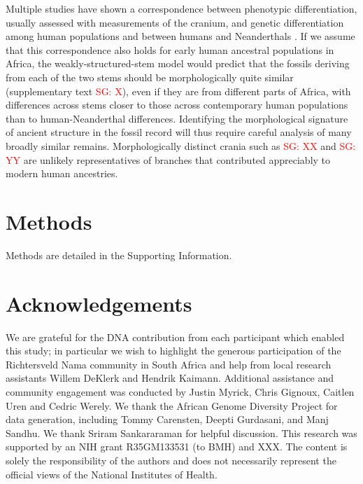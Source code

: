 \documentclass[]{article}
\newcommand{\sgcomment}[1]{{\textcolor{red}{SG: #1}}}
\begin{document}
Multiple studies have shown a correspondence between phenotypic
differentiation, usually assessed with measurements of the cranium, and genetic
differentiation among human populations and between humans and Neanderthals
\citep{Relethford1994-mh,Weaver2008-ho,Von_Cramon-Taubadel2009-zb}. If we
assume that this correspondence also holds for early human ancestral
populations in Africa, the weakly-structured-stem model would predict that the
fossils deriving from each of the two stems should be morphologically quite
similar (supplementary text \sgcomment{X}), even if
they are from different parts of Africa, with differences across stems closer
to those across contemporary human populations than to human-Neanderthal
differences. Identifying the morphological signature of ancient
structure in the fossil record will thus require careful analysis of many broadly
similar remains. Morphologically distinct
crania such as \sgcomment{XX} and \sgcomment{YY} are unlikely representatives of branches that
contributed appreciably to modern human ancestries.

\section*{Methods}

Methods are detailed in the Supporting Information.

\section*{Acknowledgements}

We are grateful for the DNA contribution from each participant which enabled
this study; in particular we wish to highlight the generous participation of
the Richtersveld Nama community in South Africa and help from local research
assistants Willem DeKlerk and Hendrik Kaimann. Additional assistance and
community engagement was conducted by Justin Myrick, Chris Gignoux, Caitlen
Uren and Cedric Werely. We thank the African Genome Diversity Project for data
generation, including Tommy Carensten, Deepti Gurdasani, and Manj Sandhu. We
thank Sriram Sankararaman for helpful discussion. This research was
supported by an NIH grant R35GM133531 (to BMH) and XXX. The content is solely
the responsibility of the authors and does not necessarily represent the
official views of the National Institutes of Health.



\end{document}

